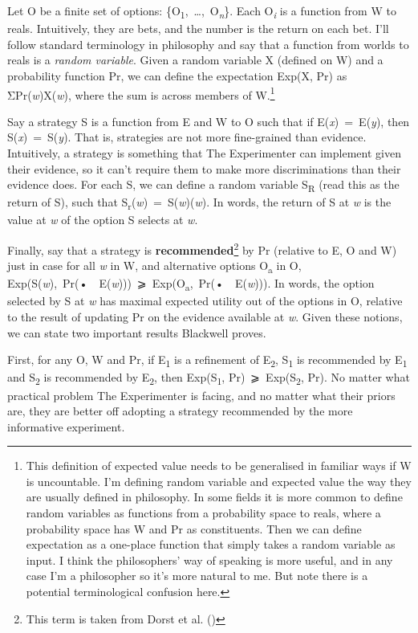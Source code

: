 \documentclass[
  11pt,
  letterpaper,
  DIV=11,
  numbers=noendperiod,
  twoside]{scrartcl}
\begin{document}
Let O be a finite set of options:
\{O\textsubscript{1},~\ldots,~O\textsubscript{\emph{n}}\}. Each
O\textsubscript{\emph{i}} is a function from W to reals. Intuitively,
they are bets, and the number is the return on each bet. I'll follow
standard terminology in philosophy and say that a function from worlds
to reals is a \emph{random variable}. Given a random variable X (defined
on W) and a probability function Pr, we can define the expectation
Exp(X, Pr) as ΣPr(\emph{w})X(\emph{w}), where the sum is across members
of W.\footnote{This definition of expected value needs to be generalised
  in familiar ways if W is uncountable. I'm defining random variable and
  expected value the way they are usually defined in philosophy. In some
  fields it is more common to define random variables as functions from
  a probability space to reals, where a probability space has W and Pr
  as constituents. Then we can define expectation as a one-place
  function that simply takes a random variable as input. I think the
  philosophers' way of speaking is more useful, and in any case I'm a
  philosopher so it's more natural to me. But note there is a potential
  terminological confusion here.}

Say a strategy S is a function from E and W to O such that if
E(\emph{x})~=~E(\emph{y}), then S(\emph{x})~=~S(\emph{y}). That is,
strategies are not more fine-grained than evidence. Intuitively, a
strategy is something that The Experimenter can implement given their
evidence, so it can't require them to make more discriminations than
their evidence does. For each S, we can define a random variable
S\textsubscript{R} (read this as the return of S), such that
S\textsubscript{r}(\emph{w})~=~S(\emph{w})(\emph{w}). In words, the
return of S at \emph{w} is the value at \emph{w} of the option S selects
at \emph{w}.

Finally, say that a strategy is \textbf{recommended}\footnote{This term
  is taken from Dorst et al. ()} by Pr
(relative to E, O and W) just in case for all \emph{w} in W, and
alternative options O\textsubscript{a} in O,
Exp(S(\emph{w}),~Pr(•~\textbar~E(\emph{w})))~⩾~Exp(O\textsubscript{a},~Pr(•~\textbar~E(\emph{w}))).
In words, the option selected by S at \emph{w} has maximal expected
utility out of the options in O, relative to the result of updating Pr
on the evidence available at \emph{w}. Given these notions, we can state
two important results Blackwell proves.

First, for any O, W and Pr, if E\textsubscript{1} is a refinement of
E\textsubscript{2}, S\textsubscript{1} is recommended by
E\textsubscript{1} and S\textsubscript{2} is recommended by
E\textsubscript{2}, then Exp(S\textsubscript{1},
Pr)~⩾~Exp(S\textsubscript{2}, Pr). No matter what practical problem The
Experimenter is facing, and no matter what their priors are, they are
better off adopting a strategy recommended by the more informative
experiment.
\end{document}
